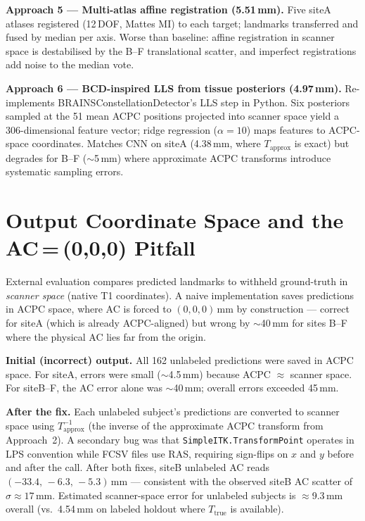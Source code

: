\documentclass[11pt,letterpaper]{article}
\begin{document}
\textbf{Approach 5 — Multi-atlas affine registration (5.51\,mm).}
Five siteA atlases registered (12\,DOF, Mattes MI) to each target; landmarks transferred
and fused by median per axis.
Worse than baseline: affine registration in scanner space is destabilised by the B--F
translational scatter, and imperfect registrations add noise to the median vote.

\textbf{Approach 6 — BCD-inspired LLS from tissue posteriors (4.97\,mm).}
Re-implements BRAINSConstellationDetector's \cite{johnson2007brainsfit} LLS step in Python.
Six posteriors sampled at the 51 mean ACPC positions projected into scanner space yield a
306-dimensional feature vector; ridge regression ($\alpha=10$) maps features to ACPC-space
coordinates.
Matches CNN on siteA (4.38\,mm, where $T_\text{approx}$ is exact) but degrades for B--F
($\sim$5\,mm) where approximate ACPC transforms introduce systematic sampling errors.

\section{Output Coordinate Space and the AC\,=\,(0,0,0) Pitfall}
\label{sec:coords}

External evaluation compares predicted landmarks to withheld ground-truth in \emph{scanner
space} (native T1 coordinates).
A naive implementation saves predictions in ACPC space, where AC is forced to
$(0,0,0)$\,mm by construction — correct for siteA (which is already ACPC-aligned) but
wrong by $\sim$40\,mm for sites B--F where the physical AC lies far from the origin.

\textbf{Initial (incorrect) output.}
All 162 unlabeled predictions were saved in ACPC space.
For siteA, errors were small ($\sim$4.5\,mm) because ACPC $\approx$ scanner space.
For siteB--F, the AC error alone was $\sim$40\,mm; overall errors exceeded 45\,mm.

\textbf{After the fix.}
Each unlabeled subject's predictions are converted to scanner space using
$T_\text{approx}^{-1}$ (the inverse of the approximate ACPC transform from Approach~2).
A secondary bug was that \texttt{SimpleITK.TransformPoint} operates in LPS convention while
FCSV files use RAS, requiring sign-flips on $x$ and $y$ before and after the call.
After both fixes, siteB unlabeled AC reads $(-33.4,\,-6.3,\,-5.3)\,\text{mm}$ — consistent
with the observed siteB AC scatter of $\sigma\approx17$\,mm.
Estimated scanner-space error for unlabeled subjects is $\approx$9.3\,mm overall
(vs.\ 4.54\,mm on labeled holdout where $T_\text{true}$ is available).
\end{document}
